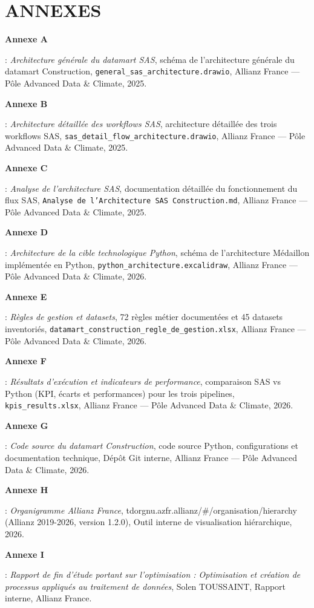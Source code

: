 \chapter*{ANNEXES}
{}

\vspace{0.5cm}

\setlength{\parindent}{0pt}
\setlength{\parskip}{0.3cm}

\hypertarget{annexe.A}{\textbf{Annexe A}} : \textit{Architecture générale du datamart SAS}, schéma de l’architecture générale du datamart Construction, \texttt{general\_sas\_architecture.drawio}, Allianz France — Pôle Advanced Data \& Climate, 2025.

\hypertarget{annexe.B}{\textbf{Annexe B}} : \textit{Architecture détaillée des workflows SAS}, architecture détaillée des trois workflows SAS, \texttt{sas\_detail\_flow\_architecture.drawio}, Allianz France — Pôle Advanced Data \& Climate, 2025.

\hypertarget{annexe.C}{\textbf{Annexe C}} : \textit{Analyse de l'architecture SAS}, documentation détaillée du fonctionnement du flux SAS, \texttt{Analyse de l'Architecture SAS Construction.md}, Allianz France — Pôle Advanced Data \& Climate, 2025.

\hypertarget{annexe.D}{\textbf{Annexe D}} : \textit{Architecture de la cible technologique Python}, schéma de l’architecture Médaillon implémentée en Python, \texttt{python\_architecture.excalidraw}, Allianz France — Pôle Advanced Data \& Climate, 2026.

\hypertarget{annexe.E}{\textbf{Annexe E}} : \textit{Règles de gestion et datasets}, 72 règles métier documentées et 45 datasets inventoriés, \texttt{datamart\_construction\_regle\_de\_gestion.xlsx}, Allianz France — Pôle Advanced Data \& Climate, 2026.

\hypertarget{annexe.F}{\textbf{Annexe F}} : \textit{Résultats d'exécution et indicateurs de performance}, comparaison SAS vs Python (KPI, écarts et performances) pour les trois pipelines, \texttt{kpis\_results.xlsx}, Allianz France — Pôle Advanced Data \& Climate, 2026.

\hypertarget{annexe.G}{\textbf{Annexe G}} : \textit{Code source du datamart Construction}, code source Python, configurations et documentation technique, Dépôt Git interne, Allianz France — Pôle Advanced Data \& Climate, 2026.

\hypertarget{annexe.H}{\textbf{Annexe H}} : \textit{Organigramme Allianz France}, tdorgnu.azfr.allianz/\#/organisation/hierarchy (Allianz 2019-2026, version 1.2.0), Outil interne de visualisation hiérarchique, 2026.

\hypertarget{annexe.I}{\textbf{Annexe I}} : \textit{Rapport de fin d'étude portant sur l'optimisation : Optimisation et création de processus appliqués au traitement de données}, Solen TOUSSAINT, Rapport interne, Allianz France.
